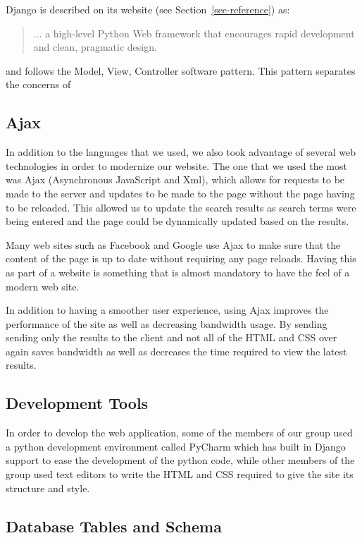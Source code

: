 \documentclass[11pt]{article}
\begin{document}
Django is described on its website (see Section~\vref{sec-reference})
as:

\begin{quotation}
  ... a high-level Python Web framework that encourages rapid
  development and clean, pragmatic design.
\end{quotation}

and follows the Model, View, Controller software pattern. This pattern
separates the concerns of


\subsection{Ajax}

In addition to the languages that we used, we also took advantage of
several web technologies in order to modernize our website. The one
that we used the most was Ajax (Asynchronous JavaScript and Xml),
which allows for requests to be made to the server and updates to be
made to the page without the page having to be reloaded. This allowed
us to update the search results as search terms were being entered and
the page could be dynamically updated based on the results.

Many web sites such as Facebook and Google use Ajax to make sure that
the content of the page is up to date without requiring any page
reloads. Having this as part of a website is something that is almost
mandatory to have the feel of a modern web site.

In addition to having a smoother user experience, using Ajax improves
the performance of the site as well as decreasing bandwidth usage. By
sending sending only the results to the client and not all of the HTML
and CSS over again saves bandwidth as well as decreases the time
required to view the latest results. 

\subsection{Development Tools}

In order to develop the web application, some of the members of our
group used a python development environment called PyCharm which has
built in Django support to ease the development of the python
code, while other members of the group used text editors to write the
HTML and CSS required to give the site its structure and style.


\subsection{Database Tables and Schema}
\end{document}
